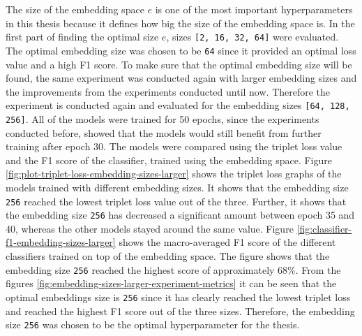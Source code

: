 \noindent
The size of the embedding space $e$ is one of the most important hyperparameters in this thesis because it defines how big the size of the embedding space is. In the first part of finding the optimal size $e$, sizes \texttt{[2, 16, 32, 64]} were evaluated. The optimal embedding size was chosen to be \texttt{64} since it provided an optimal loss value and a high F1 score. To make sure that the optimal embedding size will be found, the same experiment was conducted again with larger embedding sizes and the improvements from the experiments conducted until now. Therefore the experiment is conducted again and evaluated for the embedding sizes  \texttt{[64, 128, 256]}. All of the models were trained for 50 epochs, since the experiments conducted before, showed that the models would still benefit from further training after epoch 30. The models were compared using the triplet loss value and the F1 score of the classifier, trained using the embedding space.
\newline
\newline
Figure \ref{fig:plot-triplet-loss-embedding-sizes-larger} shows the triplet loss graphs of the models trained with different embedding sizes. It shows that the embedding size \texttt{256} reached the lowest triplet loss value out of the three. Further, it shows that the embedding size \texttt{256} has decreased a significant amount between epoch 35 and 40, whereas the other models stayed around the same value. Figure \ref{fig:classifier-f1-embedding-sizes-larger} shows the macro-averaged F1 score of the different classifiers trained on top of the embedding space. The figure shows that the embedding size \texttt{256} reached the highest score of approximately 68\%.
\newline
\newline
From the figures \ref{fig:embedding-sizes-larger-experiment-metrics} it can be seen that the optimal embeddings size is \texttt{256} since it has clearly reached the lowest triplet loss and reached the highest F1 score out of the three sizes. Therefore, the embedding size \texttt{256} was chosen to be the optimal hyperparameter for the thesis.

